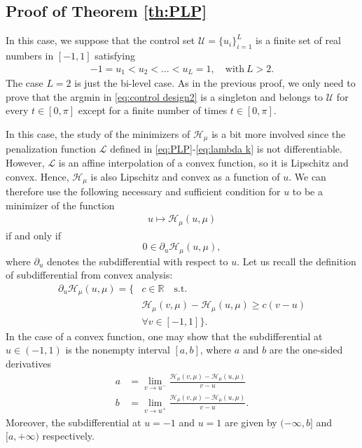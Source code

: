\documentclass[twocolumn]{autart}    %
\begin{document}
\begin{remark}
\subsection{Proof of Theorem \ref{th:PLP}}\label{proof:PLP}

In this case, we suppose that the control set $\mathcal{U} = \{ u_i\}_{i=1}^L$ is a finite set of real numbers in $[-1,1]$ satisfying
\begin{align*} 
	-1 = u_1 < u_2 <\ldots <u_L = 1, \quad \text{with} \ L> 2.
\end{align*} 
The case $L=2$ is just the bi-level case. As in the previous proof, we only need to prove that the argmin in \eqref{eq:control design2} is a singleton and belongs to $\mathcal{U}$ for every $t\in [0,\pi]$ except for a finite number of times $t\in [0,\pi]$.

In this case, the study of the minimizers of $\mathcal{H}_\mu$ is a bit more involved since the penalization function $\mathcal{L}$ defined in \eqref{eq:PLP}-\eqref{eq:lambda k} is not differentiable. However, $\mathcal{L}$ is an affine interpolation of a convex function, so it is Lipschitz and convex.  Hence, $\mathcal{H}_\mu$ is also Lipschitz and convex as a function of $u$. We can therefore use the following necessary and sufficient condition for $u$ to be a minimizer of  the function 
\begin{align*}
	u\mapsto \mathcal{H}_\mu (u,\mu)
\end{align*}
if and only if
\begin{equation}\label{opti cond subdiff}
	0\in \partial_u \mathcal{H}_\mu (u,\mu),
\end{equation}
where $\partial_u$ denotes the subdifferential with respect to $u$. Let us recall the definition of subdifferential from convex analysis:
\begin{align*}
	\partial_u \mathcal{H}_\mu (u,\mu) = \{  & c\in \mathbb{R} \quad \text{s.t.} 
	\\
	&\mathcal{H}_\mu (v,\mu) - \mathcal{H}_\mu (u,\mu) \geq c(v-u) 
	\\
	& \forall v\in [-1,1] \}. 
\end{align*}
In the case of a convex function, one may show that the subdifferential at $u\in (-1,1)$ is the nonempty interval $[a,b]$, where $a$ and $b$ are the one-sided derivatives
\begin{align*}
	a &= \lim_{v\to u^-} \frac{\mathcal{H}_\mu (v,\mu) - \mathcal{H}_\mu(u,\mu)}{v-u} 
	\\[5pt]
	b &= \lim_{v\to u^+} \frac{\mathcal{H}_\mu (v,\mu) - \mathcal{H}_\mu(u,\mu)}{v-u}. 
\end{align*}
Moreover, the subdifferential at $u=-1$ and $u=1$ are given by $(-\infty, b]$ and $[a,+\infty)$ respectively.


\end{remark}
\end{document}

